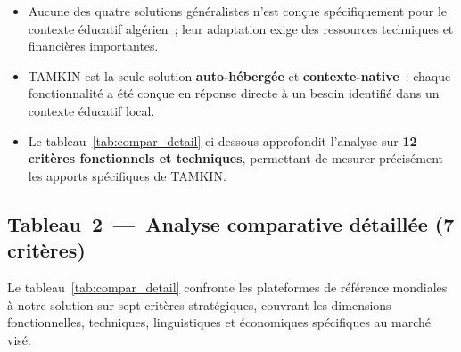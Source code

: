 \documentclass[12pt,a4paper,oneside]{report}
\begin{document}
\medskip
\begin{tcolorbox}[
  colback  = ustolightblue!20,
  colframe = ustoblue,
  coltitle = white,
  fonttitle= \bfseries,
  title    = {Observations cl\'es issues du tableau~\ref{tab:compar_synth}~---~vers une analyse crit\`ere par crit\`ere},
  left=8pt, right=8pt, top=6pt, bottom=6pt,
  sharp corners=south
]
\begin{itemize}
  \item Aucune des quatre solutions g\'en\'eralistes n'est con\c{c}ue sp\'ecifiquement pour le contexte éducatif algérien~; leur adaptation exige des ressources techniques et financi\`eres importantes.
  \item TAMKIN est la seule solution \textbf{auto-h\'eberg\'ee} et \textbf{contexte-native}~: chaque fonctionnalit\'e a \'et\'e con\c{c}ue en r\'eponse directe \`a un besoin identifi\'e dans un contexte éducatif local.
  \item Le tableau~\ref{tab:compar_detail} ci-dessous approfondit l'analyse sur \textbf{12 crit\`eres fonctionnels et techniques}, permettant de mesurer pr\'ecis\'ement les apports sp\'ecifiques de TAMKIN.
\end{itemize}
\end{tcolorbox}
\medskip

\subsection{Tableau~2~---~Analyse comparative d\'etaill\'ee (7 crit\`eres)}

Le tableau~\ref{tab:compar_detail} confronte les plateformes de r\'ef\'erence mondiales \`a notre solution sur sept crit\`eres strat\'egiques, couvrant les dimensions fonctionnelles, techniques, linguistiques et \'economiques sp\'ecifiques au march\'e vis\'e.
\end{document}
